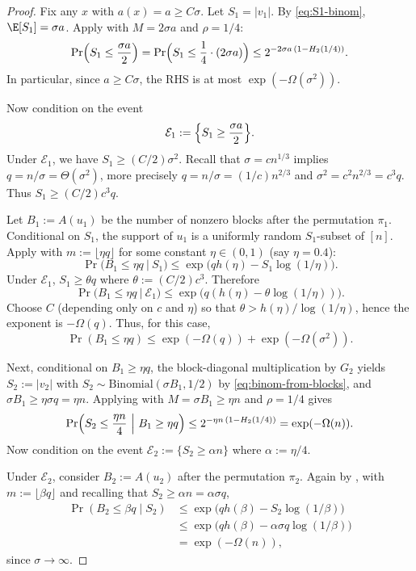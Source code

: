 \begin{proof}
Fix any $x$ with $a(x)=a\ge C\sigma$.
Let $S_1=|v_1|$. By \eqref{eq:S1-binom}, $\E[S_1]=\sigma a$.
Apply  with $M=2\sigma a$ and $\rho=1/4$:
\[
\Pr\Bigl(S_1\le \frac{\sigma a}{2}\Bigr)
=\Pr\Bigl(S_1\le \frac14\cdot (2\sigma a)\Bigr)
\le 2^{-2\sigma a\,(1-H_2(1/4))}.
\]
In particular, since $a\ge C\sigma$, the RHS is at most $\exp(-\Omega(\sigma^2))$.

Now condition on the event
\[
\mathcal E_1:=\Bigl\{S_1\ge \frac{\sigma a}{2}\Bigr\}.
\]
Under $\mathcal E_1$, we have $S_1\ge (C/2)\sigma^2$.
Recall that $\sigma = c n^{1/3}$ implies $q=n/\sigma=\Theta(\sigma^2)$, more precisely
$q = n/\sigma = (1/c)n^{2/3}$ and $\sigma^2=c^2 n^{2/3}=c^3 q$.
Thus $S_1\ge (C/2)c^3 q$.

Let $B_1:=A(u_1)$ be the number of nonzero blocks after the permutation $\pi_1$.
Conditional on $S_1$, the support of $u_1$ is a uniformly random $S_1$-subset of $[n]$.
Apply  with $m:=\lfloor \eta q\rfloor$ for some constant $\eta\in(0,1)$ (say $\eta=0.4$):
\[
\Pr\bigl(B_1\le \eta q\ \big|\ S_1\bigr)
\le \exp\!\bigl(q h(\eta)-S_1\log(1/\eta)\bigr).
\]
Under $\mathcal E_1$, $S_1\ge \theta q$ where $\theta:=(C/2)c^3$.
Therefore
\[
\Pr\bigl(B_1\le \eta q\ \big|\ \mathcal E_1\bigr)
\le \exp\!\bigl(q(h(\eta)-\theta\log(1/\eta))\bigr).
\]
Choose $C$ (depending only on $c$ and $\eta$) so that $\theta>h(\eta)/\log(1/\eta)$, hence the exponent is $-\Omega(q)$.
Thus, for this case,
\begin{equation}\label{eq:caseI_B1}
\Pr(B_1\le \eta q)\le \exp(-\Omega(q))+\exp(-\Omega(\sigma^2)).
\end{equation}

Next, conditional on $B_1\ge \eta q$, the block-diagonal multiplication by $G_2$ yields $S_2:=|v_2|$ with
$S_2\sim \mathrm{Binomial}(\sigma B_1,1/2)$ by \eqref{eq:binom-from-blocks}, and $\sigma B_1\ge \eta \sigma q=\eta n$.
Applying  with $M=\sigma B_1\ge \eta n$ and $\rho=1/4$ gives
\begin{equation}\label{eq:caseI_S2}
\Pr\Bigl(S_2\le \frac{\eta n}{4}\ \Big|\ B_1\ge \eta q\Bigr)\le 2^{-\eta n\,(1-H_2(1/4))}=\exp(-\Omega(n)).
\end{equation}
Now condition on the event $\mathcal E_2:=\{S_2\ge \alpha n\}$ where $\alpha:=\eta/4$.

Under $\mathcal E_2$, consider $B_2:=A(u_2)$ after the permutation $\pi_2$.
Again by , with $m:=\lfloor \beta q\rfloor$ and recalling that $S_2\ge \alpha n=\alpha\sigma q$,
\begin{align*}
\Pr(B_2\le \beta q\mid S_2) 
    &\le \exp\!\bigl(qh(\beta)-S_2\log(1/\beta)\bigr) \\
    &\le \exp\!\bigl(qh(\beta)-\alpha\sigma q \log(1/\beta)\bigr) \\
    &= \exp(-\Omega(n)),
\end{align*}
since $\sigma\to\infty$.


\end{proof}
